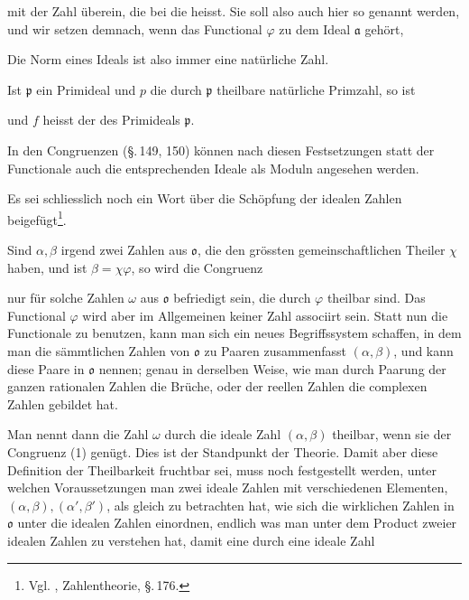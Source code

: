 mit der Zahl überein, die bei  die 
heisst. Sie soll also auch hier so genannt werden, und wir setzen
demnach, wenn das Functional $\varphi$ zu dem Ideal $\mathfrak{a}$ gehört,


Die Norm eines Ideals ist also immer eine natürliche Zahl.

Ist $\mathfrak{p}$ ein Primideal und $p$ die durch $\mathfrak{p}$ theilbare natürliche
Primzahl, so ist


und $f$ heisst der  des Primideals $\mathfrak{p}$.

In den Congruenzen (\S.\,149, 150) können nach diesen Festsetzungen
 statt der Functionale auch die entsprechenden Ideale
als Moduln angesehen werden.

Es sei schliesslich noch ein Wort über die 
Schöpfung der idealen Zahlen beigefügt\footnote{Vgl. , Zahlentheorie, \S.\,176.}.

Sind $\alpha, \beta$ irgend zwei Zahlen aus $\mathfrak{o}$, die den grössten
gemeinschaftlichen Theiler $\chi$ haben, und ist $\beta = \chi\varphi$, so wird
die Congruenz


nur für solche Zahlen $\omega$ aus $\mathfrak{o}$ befriedigt sein, die durch $\varphi$
theilbar sind. Das Functional $\varphi$ wird aber im Allgemeinen
keiner Zahl associirt sein. Statt nun die Functionale zu benutzen,
kann man sich ein neues Begriffssystem schaffen, in dem
man die sämmtlichen Zahlen von $\mathfrak{o}$ zu Paaren zusammenfasst
$(\alpha, \beta)$, und kann diese Paare \glqq {}\grqq{} in $\mathfrak{o}$ nennen;
genau in derselben Weise, wie man durch Paarung der ganzen
rationalen Zahlen die Brüche, oder der reellen Zahlen die
complexen Zahlen gebildet hat.

Man nennt dann die Zahl $\omega$ durch die ideale Zahl $(\alpha, \beta)$
theilbar, wenn sie der Congruenz (1) genügt. %
Dies ist der Standpunkt
 der  Theorie. Damit aber diese Definition
der Theilbarkeit fruchtbar sei, muss noch festgestellt werden,
unter welchen Voraussetzungen man zwei ideale Zahlen mit verschiedenen
 Elementen, $(\alpha, \beta), (\alpha', \beta')$, als gleich zu betrachten
hat, wie sich die wirklichen Zahlen in $\mathfrak{o}$ unter die idealen Zahlen
einordnen, endlich was man unter dem Product zweier idealen
Zahlen zu verstehen hat, damit eine durch eine ideale Zahl
